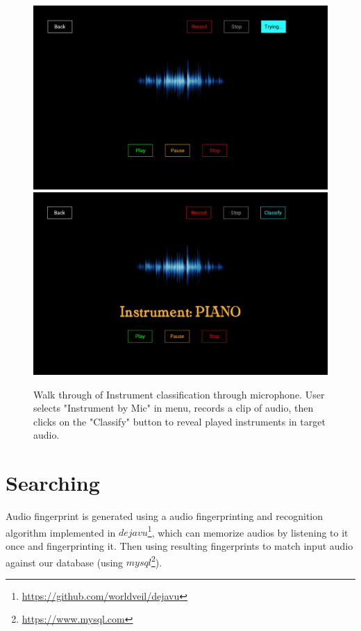 \documentclass[whitelogo,12pt]{tudelft-report}
\begin{document}
\begin{figure}[!htb]
  \includegraphics[width=\linewidth]{im3}
\endminipage\hfill
{}
  \includegraphics[width=\linewidth]{im4}
\endminipage\hfill

\caption{Walk through of Instrument classification through microphone. User selects "Instrument by Mic" in menu, records a clip of  audio, then clicks on the "Classify" button to reveal played instruments in target audio.}
\label{fig:im}
\end{figure}

\section{Searching}
Audio fingerprint is generated using a audio fingerprinting and recognition algorithm implemented in $dejavu$\footnote{\url{https://github.com/worldveil/dejavu}}, which can memorize audios by listening to it once and fingerprinting it. Then using resulting fingerprints to match input audio against our database (using $mysql$\footnote{\url{https://www.mysql.com}}).
\end{document}
